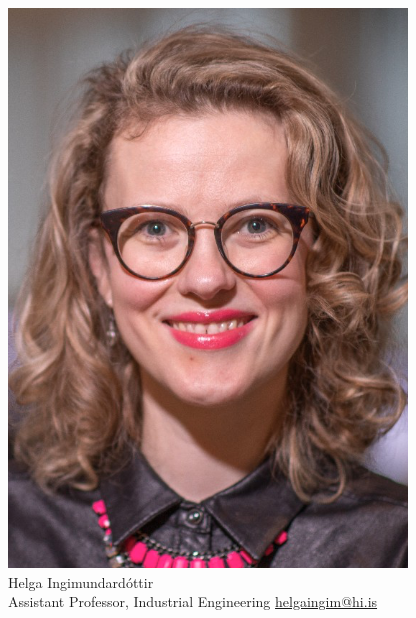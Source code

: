 \documentclass[
    NAME={Dr. Helga Ingimundardóttir},
    EMAIL={helgaingim@hi.is},
    FACULTY={Industrial Engineering},
    TITLE={Business Intelligence},
    SUBTITLE={Introduction},
    SEMINAR={IÐN610M},
    DATE={Spring, 2024}
]{HI-LaTeX/hi-beamer}
\begin{document}
\begin{frame}
\begin{figure}
\begin{minipage}[t]{0.3\textwidth}
                \includegraphics[width=\linewidth]{figures/helgaingim}
                Helga Ingimundardóttir \\
                Assistant Professor, Industrial Engineering
                \url{helgaingim@hi.is}
            \end{minipage}
            \hfill
            \begin{minipage}[t]{0.3\textwidth}
                \centering

\end{minipage}
\end{figure}
\end{frame}
\end{document}
